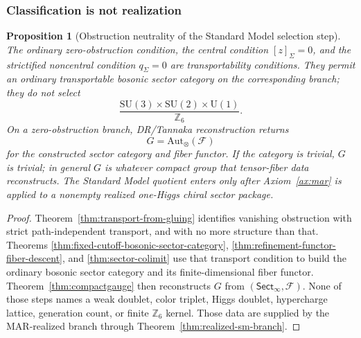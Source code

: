 \documentclass[11pt]{article}
\newtheorem{proposition}[theorem]{Proposition}
\newcommand{\SU}{\mathrm{SU}}
\newcommand{\U}{\mathrm{U}}
\begin{document}
\subsubsection{Classification is not realization}

\begin{proposition}[Obstruction neutrality of the Standard Model selection step]\label{prop:obstruction-neutrality}
The ordinary zero-obstruction condition, the central condition \([z]_\Sigma=0\), and the
strictified noncentral condition \(q_\Sigma=0\) are transportability conditions. They permit an
ordinary transportable bosonic sector category on the corresponding branch; they do not select
\[
\frac{\SU(3)\times\SU(2)\times\U(1)}{\mathbb Z_6}.
\]
On a zero-obstruction branch, DR/Tannaka reconstruction returns
\[
G=\mathrm{Aut}_\otimes(\mathcal F)
\]
for the constructed sector category and fiber functor. If the category is trivial, \(G\) is
trivial; in general \(G\) is whatever compact group that tensor-fiber data reconstructs. The
Standard Model quotient enters only after Axiom~\ref{ax:mar} is applied to a nonempty realized
one-Higgs chiral sector package.
\end{proposition}

\begin{proof}
Theorem~\ref{thm:transport-from-gluing} identifies vanishing obstruction with strict
path-independent transport, and with no more structure than that. Theorems
\ref{thm:fixed-cutoff-bosonic-sector-category}, \ref{thm:refinement-functor-fiber-descent}, and
\ref{thm:sector-colimit} use that transport condition to build the ordinary bosonic
sector category and its finite-dimensional fiber functor. Theorem~\ref{thm:compactgauge} then
reconstructs \(G\) from \((\mathsf{Sect}_\infty,\mathcal F)\). None of those steps names a weak
doublet, color triplet, Higgs doublet, hypercharge lattice, generation count, or finite
\(\mathbb Z_6\) kernel. Those data are supplied by the MAR-realized branch through
Theorem~\ref{thm:realized-sm-branch}.
\end{proof}
\end{document}
